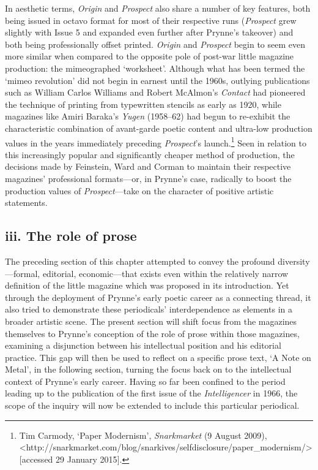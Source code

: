 \documentclass[]{article}
\begin{document}
In aesthetic terms, \emph{Origin} and \emph{Prospect} also share a
number of key features, both being issued in octavo format for most of
their respective runs (\emph{Prospect} grew slightly with Issue 5 and
expanded even further after Prynne's takeover) and both being
professionally offset printed. \emph{Origin} and \emph{Prospect} begin
to seem even more similar when compared to the opposite pole of post-war
little magazine production: the mimeographed `worksheet'. Although what
has been termed the `mimeo revolution' did not begin in earnest until
the 1960s, outlying publications such as William Carlos Williams and
Robert McAlmon's \emph{Contact} had pioneered the technique of printing
from typewritten stencils as early as 1920, while magazines like Amiri
Baraka's \emph{Yugen} (1958--62) had begun to re-exhibit the
characteristic combination of avant-garde poetic content and ultra-low
production values in the years immediately preceding \emph{Prospect}'s
launch.\footnote{Tim Carmody, `Paper Modernism', \emph{Snarkmarket} (9
  August 2009),
  \textless{}http://snarkmarket.com/blog/snarkives/selfdisclosure/paper\_modernism/\textgreater{}
  {[}accessed 29 January 2015{]}.} Seen in relation to this increasingly
popular and significantly cheaper method of production, the decisions
made by Feinstein, Ward and Corman to maintain their respective
magazines' professional formats---or, in Prynne's case, radically to
boost the production values of \emph{Prospect}---take on the character
of positive artistic statements.

\subsection{iii. The role of prose}\label{iii.-the-role-of-prose}

The preceding section of this chapter attempted to convey the profound
diversity---formal, editorial, economic---that exists even within the
relatively narrow definition of the little magazine which was proposed
in its introduction. Yet through the deployment of Prynne's early poetic
career as a connecting thread, it also tried to demonstrate these
periodicals' interdependence as elements in a broader artistic scene.
The present section will shift focus from the magazines themselves to
Prynne's conception of the role of prose within those magazines,
examining a disjunction between his intellectual position and his
editorial practice. This gap will then be used to reflect on a specific
prose text, `A Note on Metal', in the following section, turning the
focus back on to the intellectual context of Prynne's early career.
Having so far been confined to the period leading up to the publication
of the first issue of the \emph{Intelligencer} in 1966, the scope of the
inquiry will now be extended to include this particular periodical.
\end{document}
